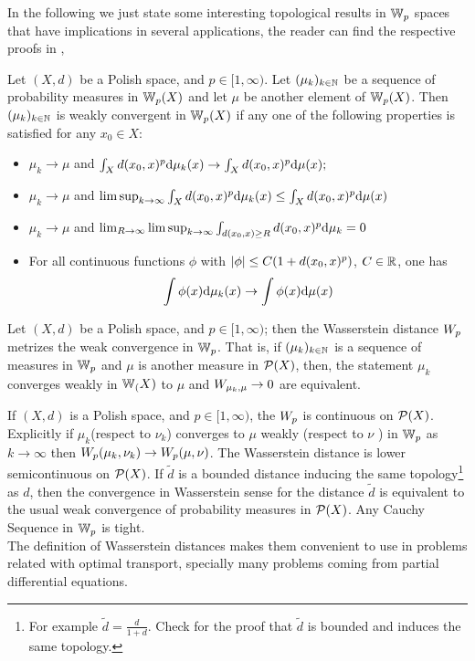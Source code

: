 In the following we just state some interesting topological results in $\mathbb{W}_{p}$ spaces that have implications in several applications, the reader can find the respective proofs in \cite{Villani2008OT},
\begin{definition}
	Let $(X,d)$ be a Polish space, and $p\in[1,\infty)$. Let $(\mu_k)_{k\in\mathbb{N}}$ be a sequence of probability measures in $\mathbb{W}_{p}(X)$ and let $\mu$ be another element of $\mathbb{W}_{p}(X)$. Then $(\mu_k)_{k\in\mathbb{N}}$ is weakly convergent in $\mathbb{W}_{p}(X)$ if any one of the following properties is satisfied for any $x_0\in X$:
	\begin{itemize}
		\item $\mu_k\rightarrow \mu$ and $ \int_{X} d(x_0, x)^p \mathrm{d}\mu_k(x)\rightarrow \int_{X}d(x_0, x)^p\mathrm{d}\mu(x);$
		\item $\mu_k\rightarrow \mu$ and $\limsup_{k\rightarrow \infty}\int_{X} d(x_0, x)^p\mathrm{d}\mu_k(x)\leq \int_{X}d(x_0, x)^p\mathrm{d}\mu(x)$
		\item $\mu_k\rightarrow \mu$ and $\lim_{R\rightarrow \infty}\limsup_{k\rightarrow \infty} \int_{d(x_0,x)\geq R} d(x_0, x)^p\mathrm{d}\mu_k=0$
		\item For all continuous functions $\phi$ with $\left| \phi \right|\leq C(1+d(x_0, x)^p)$, $C\in \mathbb{R}$, one has
		\begin{equation}
			\int\phi(x)\mathrm{d}\mu_k(x)\rightarrow \int\phi(x)\mathrm{d}\mu(x)
		\end{equation}
	\end{itemize}
\end{definition}
\begin{theorem}
	Let $(X,d)$ be a Polish space, and $p\in[1,\infty)$; then the Wasserstein distance $W_{p}$ metrizes the weak convergence in $\mathbb{W}_{p}$. That is, if $(\mu_k)_{k\in\mathbb{N}}$ is a sequence of measures in $\mathbb{W}_{p}$ and $\mu$ is another measure in $\mathcal{P}(X)$, then, the statement $\mu_k$ converges weakly in $\mathbb{W}_{(}X) $ to $\mu$ and $W_{\mu_k,\mu}\rightarrow 0$ are equivalent.  
\end{theorem}
If $(X, d)$ is a Polish space, and $p\in[1,\infty)$, the $W_{p}$ is continuous on $\mathcal{P}(X)$. Explicitly if $\mu_k$(respect to $\nu_k$) converges to $\mu$ weakly (respect to $\nu$ ) in $\mathbb{W}_{p}$ as $k\rightarrow \infty$ then $W_{p}(\mu_k, \nu_k)\rightarrow W_{p}(\mu, \nu)$. The Wasserstein distance is lower semicontinuous on $\mathcal{P}(X)$. If $\tilde{d}$ is a bounded distance inducing the same topology\footnote{For example $\tilde{d}=\frac{d}{1+d}$. Check \cite{munkres2000topology} for the proof that $\tilde{d}$ is bounded and induces the same topology.} as $d$, then the convergence in Wasserstein sense for the distance $\tilde{d}$ is equivalent to the usual weak convergence of probability measures in $\mathcal{P}(X)$. Any Cauchy Sequence in $\mathbb{W}_{p}$ is tight.
\\
The definition of Wasserstein distances makes them convenient to use in problems related with optimal transport, specially many problems coming from partial differential equations.


